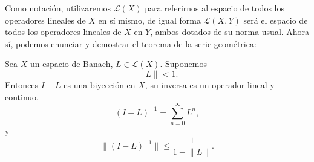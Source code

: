 Como notación, utilizaremos $\mathcal{L}(X)$ para referirnos al espacio de todos los operadores lineales de $X$ en sí mismo, de igual forma $\mathcal{L}(X,Y)$ será el espacio de todos los operadores lineales de $X$ en $Y$, ambos dotados de su norma usual. Ahora sí, podemos enunciar y demostrar el teorema de la serie geométrica:
\begin{teorema}\label{teorema}
	Sea $X$ un espacio de Banach, $L \in \mathcal{L}(X)$. Suponemos
	\begin{equation}
		\lVert L \rVert < 1.
	\end{equation}
	Entonces $I - L$ es una biyección en $X$, su inversa es un operador lineal y continuo,
	\begin{equation}
		(I-L)^{-1} = \sum_{n=0}^{\infty}L^n,
	\end{equation}
	y
	\begin{equation}\label{eq:teo1}
		\lVert (I-L)^{-1} \rVert \leqslant \dfrac{1}{1 - \lVert L \rVert}.
	\end{equation}
\end{teorema}
